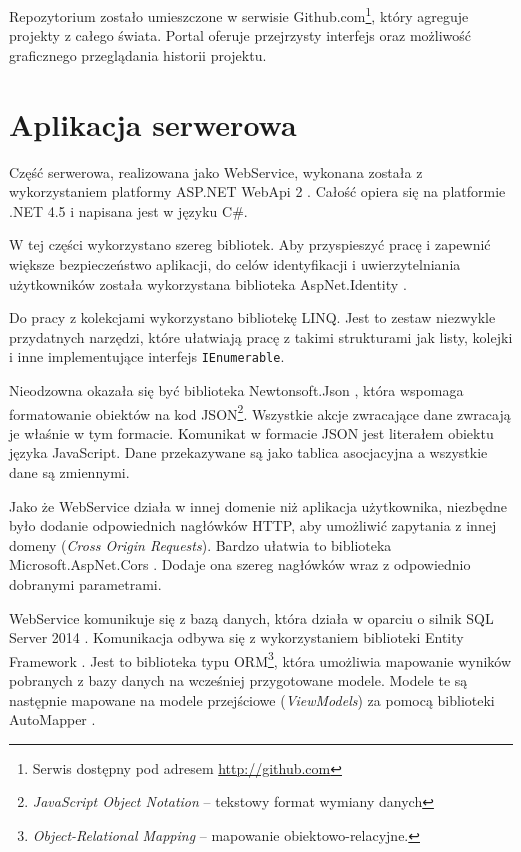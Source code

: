 \documentclass[a4paper]{book}
\begin{document}
			Repozytorium zostało umieszczone w serwisie Github.com\footnote{Serwis dostępny pod adresem \url{http://github.com}}, który agreguje projekty z całego świata. Portal oferuje przejrzysty interfejs oraz możliwość graficznego przeglądania historii projektu.
		
		\section{Aplikacja serwerowa}
		\label{id:sec:aplikacja_serwerowa}
		Część serwerowa, realizowana jako WebService, wykonana została z wykorzystaniem platformy ASP.NET WebApi 2 \cite{id:WebApi}. Całość opiera się na platformie .NET 4.5 i napisana jest w języku C\#.
		
		W tej części wykorzystano szereg bibliotek. Aby przyspieszyć pracę i zapewnić większe bezpieczeństwo aplikacji, do celów identyfikacji i uwierzytelniania użytkowników została wykorzystana biblioteka AspNet.Identity \cite{id:ASPIdentity}.
		
		Do pracy z kolekcjami wykorzystano bibliotekę LINQ. Jest to zestaw niezwykle przydatnych narzędzi, które ułatwiają pracę z takimi strukturami jak listy, kolejki i inne implementujące interfejs \texttt{IEnumerable}.
		
		Nieodzowna okazała się być biblioteka Newtonsoft.Json \cite{id:NewtonsoftJSON}, która wspomaga formatowanie obiektów na kod JSON\footnote{\emph{JavaScript Object Notation} -- tekstowy format wymiany danych}. Wszystkie akcje zwracające dane zwracają je właśnie w tym formacie. Komunikat w formacie JSON jest literałem obiektu języka JavaScript. Dane przekazywane są jako tablica asocjacyjna a wszystkie dane są zmiennymi.
		
		Jako że WebService działa w innej domenie niż aplikacja użytkownika, niezbędne było dodanie odpowiednich nagłówków HTTP, aby umożliwić zapytania z innej domeny (\emph{Cross Origin Requests}). Bardzo ułatwia to biblioteka Microsoft.AspNet.Cors \cite{id:ASPCors}. Dodaje ona szereg nagłówków wraz z odpowiednio dobranymi parametrami.
		
		WebService komunikuje się z bazą danych, która działa w oparciu o silnik SQL Server 2014 \cite{id:SQLServer}. Komunikacja odbywa się z wykorzystaniem biblioteki Entity Framework \cite{id:EntityFramework}. Jest to biblioteka typu ORM\footnote{\emph{Object-Relational Mapping} -- mapowanie obiektowo-relacyjne. },
		która umożliwia mapowanie wyników pobranych z bazy danych na wcześniej przygotowane modele. Modele te są następnie mapowane na modele przejściowe (\emph{ViewModels}) za pomocą biblioteki AutoMapper \cite{id:Automapper}.
		
\end{document}
